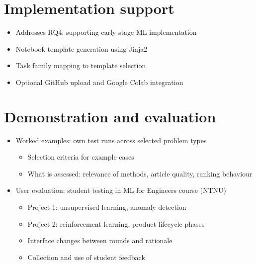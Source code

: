 \section{Implementation support}

\begin{itemize}
    \item Addresses RQ4: supporting early-stage ML implementation
    \item Notebook template generation using Jinja2
    \item Task family mapping to template selection
    \item Optional GitHub upload and Google Colab integration
\end{itemize}

\section{Demonstration and evaluation}

\begin{itemize}
    \item Worked examples: own test runs across selected problem types
    \begin{itemize}
        \item Selection criteria for example cases
        \item What is assessed: relevance of methods, article quality, ranking behaviour
    \end{itemize}
    \item User evaluation: student testing in ML for Engineers course (NTNU)
    \begin{itemize}
        \item Project 1: unsupervised learning, anomaly detection
        \item Project 2: reinforcement learning, product lifecycle phases
        \item Interface changes between rounds and rationale
        \item Collection and use of student feedback
    \end{itemize}
\end{itemize}